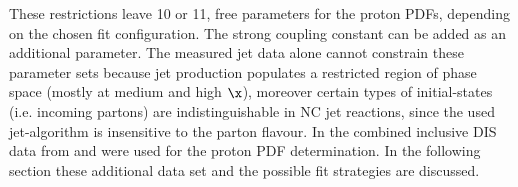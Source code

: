 These restrictions leave 10 or 11, free parameters for the proton PDFs, depending on the chosen fit configuration. The strong coupling constant \asz can be added as an additional parameter. The measured jet data alone cannot constrain these parameter sets because jet production populates a restricted region of phase space (mostly at medium and high $\x$), moreover certain types of initial-states (i.e. incoming partons) are indistinguishable in NC jet reactions, since the used jet-algorithm is insensitive to the parton flavour. In  the combined inclusive DIS data from \hone and \zeus were used for the proton PDF determination. In the following section these additional data set and the possible fit strategies are discussed.
